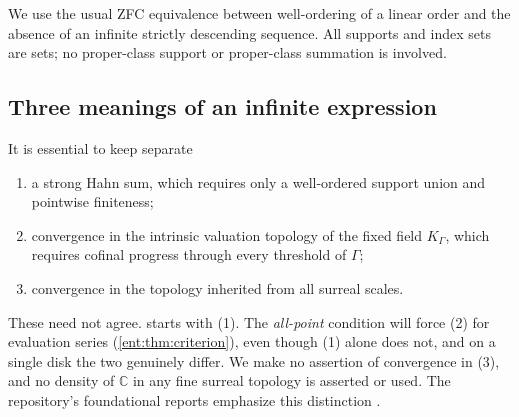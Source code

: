 \documentclass[11pt]{article}
\theoremstyle{plain}
\theoremstyle{plain}
\theoremstyle{plain}
\theoremstyle{definition}
\theoremstyle{definition}
\theoremstyle{definition}
\theoremstyle{definition}
\theoremstyle{remark}
\newcommand{\C}{\mathbb C}\newcommand{\R}{\mathbb R}
\newcommand{\K}{K_\Gamma}\newcommand{\KD}{K_\Delta}
\begin{document}
We use the usual ZFC equivalence between well-ordering of a linear order and
the absence of an infinite strictly descending sequence. All supports and
index sets are sets; no proper-class support or proper-class summation is
involved.

\subsection{Three meanings of an infinite expression}
\label{ent:subsec:three-meanings}
It is essential to keep separate
\begin{enumerate}[label=(\arabic*),leftmargin=2em]
\item a strong Hahn sum, which requires only a well-ordered support union
and pointwise finiteness;
\item convergence in the intrinsic valuation topology of the fixed field
$\K$, which requires cofinal progress through every threshold of $\Gamma$;
\item convergence in the topology inherited from all surreal scales.
\end{enumerate}
These need not agree.  starts with (1). The
\emph{all-point} condition will force (2) for evaluation series
(\cref{ent:thm:criterion}), even though (1) alone does not, and on a single
disk the two genuinely differ. We make no assertion of convergence in (3),
and no density of $\C$ in any fine surreal topology is asserted or used.
The repository's foundational reports emphasize this distinction
\cite{RepoCatalogue,RepoRankOne}.
\end{document}
